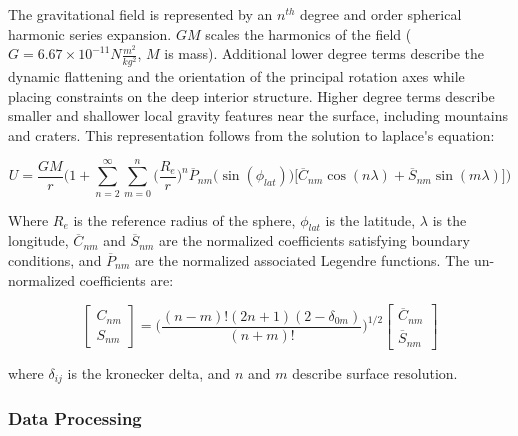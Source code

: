 \documentclass{article}
\theoremstyle{mystyle}
\begin{document}
The \gls{gravitational field} is represented by an $n^{th}$ degree and order \gls{spherical harmonic} series expansion. $GM$ scales the harmonics of the field ($G = 6.67 \times 10^{-11} N\frac{m^2}{kg^2}$, $M$ is mass). Additional lower degree terms describe the dynamic flattening
and the orientation of the \gls{principal rotation axes} while placing constraints on the deep interior structure. Higher degree terms describe smaller and shallower local gravity features near the surface, including mountains and craters. This representation follows from the solution to \gls{laplace's equation}:

\begin{equation}
U = \frac{GM}{r}\bigg(1+ \sum_{n=2}^{\infty} \sum_{m=0}^{n} \bigg(\frac{R_{e}}{r}\bigg)^n\overline{P}_{nm}\big(\sin(\phi_{lat})\big)\big[\overline{C}_{nm}\cos(n\lambda)+\overline{S}_{nm}\sin(m\lambda)\big]\bigg)
\end{equation}

\noindent Where $R_{e}$ is the reference radius of the sphere, $\phi_{lat}$ is the latitude, $\lambda$ is the longitude, $\overline{C}_{nm}$ and $\overline{S}_{nm}$ are the normalized coefficients satisfying boundary conditions, and $\overline{P}_{nm}$ are the normalized associated Legendre functions. The un-normalized coefficients are:

\begin{equation}
\begin{bmatrix}
C_{nm} \\
S_{nm}
\end{bmatrix} =
\bigg(\frac{(n-m)!(2n+1)(2-\delta_{0m})}{(n+m)!}\bigg)^{1/2}
\begin{bmatrix}
\overline{C}_{nm} \\
\overline{S}_{nm}
\end{bmatrix}
\end{equation}

\noindent where $\delta_{ij}$ is the \gls{kronecker delta}, and $n$ and $m$ describe surface resolution.

\subsubsection{\footnotesize Data Processing}
\end{document}
